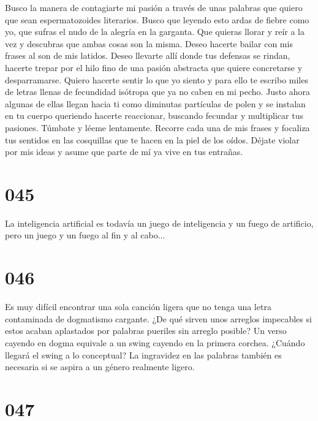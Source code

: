 \documentclass[a4paper,11pt,openright,twocolumn]{book}
\begin{document}
Busco la manera de contagiarte mi pasión a través de unas palabras que quiero que sean espermatozoides literarios. Busco que leyendo esto ardas de fiebre como yo, que sufras el nudo de la alegría en la garganta. Que quieras llorar y reír a la vez y descubras que ambas cosas son la misma. Deseo hacerte bailar con mis frases al son de mis latidos. Deseo llevarte allí donde tus defensas se rindan, hacerte trepar por el hilo fino de una pasión abstracta que quiere concretarse y desparramarse. Quiero hacerte sentir lo que yo siento y para ello te escribo miles de letras llenas de fecundidad isótropa que ya no caben en mi pecho. Justo ahora algunas de ellas llegan hacia ti como diminutas partículas de polen y se instalan en tu cuerpo queriendo hacerte reaccionar, buscando fecundar y multiplicar tus pasiones. Túmbate y léeme lentamente. Recorre cada una de mis frases y focaliza tus sentidos en las cosquillas que te hacen en la piel de los oídos. Déjate violar por mis ideas y asume que parte de mí ya vive en tus entrañas. 

\section*{045}

La inteligencia artificial es todavía un juego de inteligencia y un fuego de artificio, pero un juego y un fuego al fin y al cabo...

\section*{046}

Es muy difícil encontrar una sola canción ligera que no tenga una letra contaminada de dogmatismo cargante. ¿De qué sirven unos arreglos impecables si estos acaban aplastados por palabras pueriles sin arreglo posible? Un verso cayendo en dogma equivale a un swing cayendo en la primera corchea. ¿Cuándo llegará el swing a lo conceptual? La ingravidez en las palabras también es necesaria si se aspira a un género realmente ligero.

\section*{047}
\end{document}
